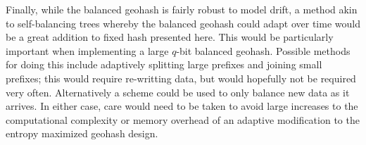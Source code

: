 \documentclass[nips13submit_09,times,art10]{article} %
\begin{document}
Finally, while the balanced geohash is fairly robust to model drift, a method akin to
self-balancing trees whereby the balanced geohash could adapt over time would be a
great addition to fixed hash presented here. This would be particularly important when
implementing a large $q$-bit balanced geohash. Possible methods for doing this include
adaptively splitting large prefixes and joining small prefixes; this would require
re-writting data, but would hopefully not be required very often. Alternatively a
scheme could be used to only balance new data as it arrives. In either case, care would
need to be taken to avoid large increases to the computational complexity or memory
overhead of an adaptive modification to the entropy maximized geohash design.

\nocite{*}

\end{document}

